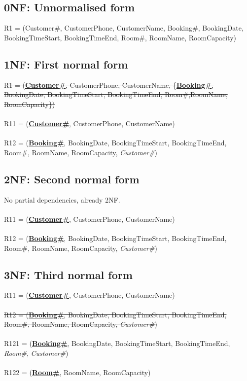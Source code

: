 \subsection{0NF: Unnormalised form}

R1 = (Customer\#, CustomerPhone, CustomerName, {Booking\#, BookingDate, BookingTimeStart, BookingTimeEnd, Room\#, RoomName, RoomCapacity})

\subsection{1NF: First normal form}

\sout{R1 = (\textbf{\underline{Customer\#}}, CustomerPhone, CustomerName, \{\textbf{\underline{Booking\#}}, BookingDate, BookingTimeStart, BookingTimeEnd, Room\#,RoomName, RoomCapacity\})}
\\\\
R11 = (\textbf{\underline{Customer\#}}, CustomerPhone, CustomerName)
\\\\
R12 = (\textbf{\underline{Booking\#}}, BookingDate, BookingTimeStart, BookingTimeEnd, Room\#, RoomName, RoomCapacity, \emph{Customer\#})

\subsection{2NF: Second normal form}

No partial dependencies, already 2NF.
\\\\
R11 = (\textbf{\underline{Customer\#}}, CustomerPhone, CustomerName)
\\\\
R12 = (\textbf{\underline{Booking\#}}, BookingDate, BookingTimeStart, BookingTimeEnd, Room\#, RoomName, RoomCapacity, \emph{Customer\#})

\subsection{3NF: Third normal form}

R11 = (\textbf{\underline{Customer\#}}, CustomerPhone, CustomerName)
\\\\
\sout{R12 = (\textbf{\underline{Booking\#}}, BookingDate, BookingTimeStart, BookingTimeEnd, Room\#, RoomName, RoomCapacity, \emph{Customer\#})}
\\\\
R121 = (\textbf{\underline{Booking\#}}, BookingDate, BookingTimeStart, BookingTimeEnd, \emph{Room\#}, \emph{Customer\#})
\\\\
R122 = (\textbf{\underline{Room\#}}, RoomName, RoomCapacity)

